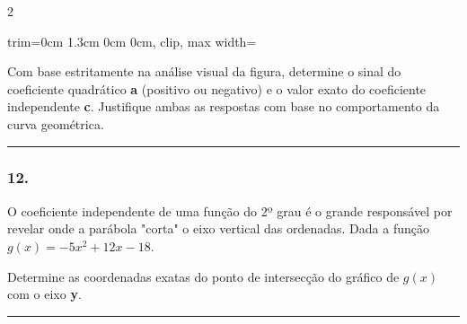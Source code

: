 \documentclass[twoside, 10pt, a4paper]{article}
\newlength{\espacoPreQuestao}
\newlength{\espacoQuestao}
\newlength{\larguraTikz}
\begin{document}
\begin{multicols*}{2}
\begin{center}
\begin{adjustbox}{trim=0cm 1.3cm 0cm 0cm, clip, max width=\larguraTikz}
\end{adjustbox}
\end{center}

Com base estritamente na análise visual da figura, determine o sinal do coeficiente quadrático \textbf{a} (positivo ou negativo) e o valor exato do coeficiente independente \textbf{c}. Justifique ambas as respostas com base no comportamento da curva geométrica.
\par\vspace{\espacoQuestao}

\noindent\textcolor{CorLinha}{\rule{\linewidth}{0.5pt}} 
\par\vspace{\espacoPreQuestao}
\subsubsection*{12.} O coeficiente independente de uma função do 2º grau é o grande responsável por revelar onde a parábola "corta" o eixo vertical das ordenadas. Dada a função $g(x) = -5x^2 + 12x - 18$.

Determine as coordenadas exatas do ponto de intersecção do gráfico de $g(x)$ com o eixo \textbf{y}.
\par\vspace{\espacoQuestao}

\noindent\textcolor{CorLinha}{\rule{\linewidth}{0.5pt}} 
\par\vspace{\espacoPreQuestao}

\end{multicols*}
\end{document}
